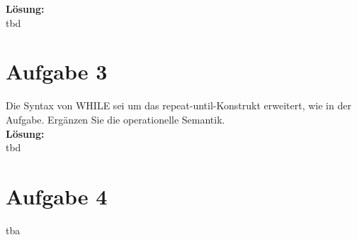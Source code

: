 \documentclass[11pt,a4paper,ngerman]{article}
\begin{document}
\textbf{Lösung:}\\

tbd

\section*{Aufgabe 3}
Die Syntax von WHILE sei um das repeat-until-Konstrukt erweitert, wie in der Aufgabe. Ergänzen Sie die operationelle Semantik.\\

\textbf{Lösung:}\\

tbd

\section*{Aufgabe 4}

tba

\label{LastPage}
\end{document}
